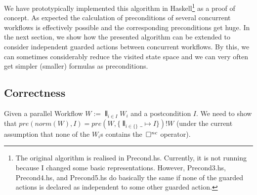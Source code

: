 \documentclass[11pt]{article}
\begin{document}
We have prototypically implemented this algorithm in Haskell\footnote{The original algorithm is realised in Precond.hs. Currently, it is not running because I changed some basic representations. However, Precond3.hs, Precond4.hs, and Precond5.hs do basically the same if none of the guarded actions is declared as independent to some other guarded action.} as a proof of concept. As expected the calculation of preconditions of several concurrent workflows is effectively possible and the corresponding preconditions get huge. In the next section, we show how the presented algorithm can be extended to consider independent guarded actions between concurrent workflows. By this, we can sometimes considerably reduce the visited state space and we can very often get simpler (smaller) formulas as preconditions.

\subsection{Correctness}

Given a parallel Workflow $W := \interleave_{i \in I} W_i$ and a postcondition $I$. We need to show that $pre(norm(W),I) = pre(W,\{\interleave_{i \in \{\}} \_ \mapsto I\})!W$ (under the current assumption that none of the $W_i$s contains the $\, \Box^{nc}$ operator).
\end{document}
